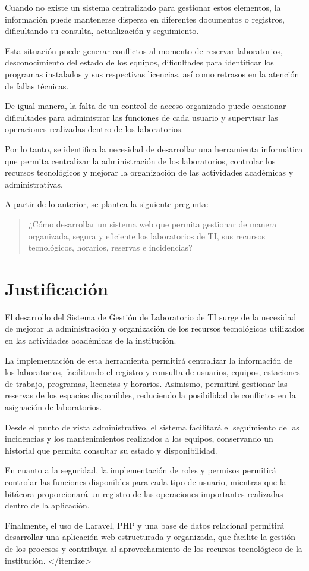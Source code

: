 Cuando no existe un sistema centralizado para gestionar estos elementos, la información puede mantenerse dispersa en diferentes documentos o registros, dificultando su consulta, actualización y seguimiento.

Esta situación puede generar conflictos al momento de reservar laboratorios, desconocimiento del estado de los equipos, dificultades para identificar los programas instalados y sus respectivas licencias, así como retrasos en la atención de fallas técnicas.

De igual manera, la falta de un control de acceso organizado puede ocasionar dificultades para administrar las funciones de cada usuario y supervisar las operaciones realizadas dentro de los laboratorios.

Por lo tanto, se identifica la necesidad de desarrollar una herramienta informática que permita centralizar la administración de los laboratorios, controlar los recursos tecnológicos y mejorar la organización de las actividades académicas y administrativas.

A partir de lo anterior, se plantea la siguiente pregunta:

\begin{quote}
¿Cómo desarrollar un sistema web que permita gestionar de manera organizada, segura y eficiente los laboratorios de TI, sus recursos tecnológicos, horarios, reservas e incidencias?
\end{quote}

\section{Justificación}

El desarrollo del Sistema de Gestión de Laboratorio de TI surge de la necesidad de mejorar la administración y organización de los recursos tecnológicos utilizados en las actividades académicas de la institución.

La implementación de esta herramienta permitirá centralizar la información de los laboratorios, facilitando el registro y consulta de usuarios, equipos, estaciones de trabajo, programas, licencias y horarios. Asimismo, permitirá gestionar las reservas de los espacios disponibles, reduciendo la posibilidad de conflictos en la asignación de laboratorios.

Desde el punto de vista administrativo, el sistema facilitará el seguimiento de las incidencias y los mantenimientos realizados a los equipos, conservando un historial que permita consultar su estado y disponibilidad.

En cuanto a la seguridad, la implementación de roles y permisos permitirá controlar las funciones disponibles para cada tipo de usuario, mientras que la bitácora proporcionará un registro de las operaciones importantes realizadas dentro de la aplicación.

Finalmente, el uso de Laravel, PHP y una base de datos relacional permitirá desarrollar una aplicación web estructurada y organizada, que facilite la gestión de los procesos y contribuya al aprovechamiento de los recursos tecnológicos de la institución.
</itemize>
